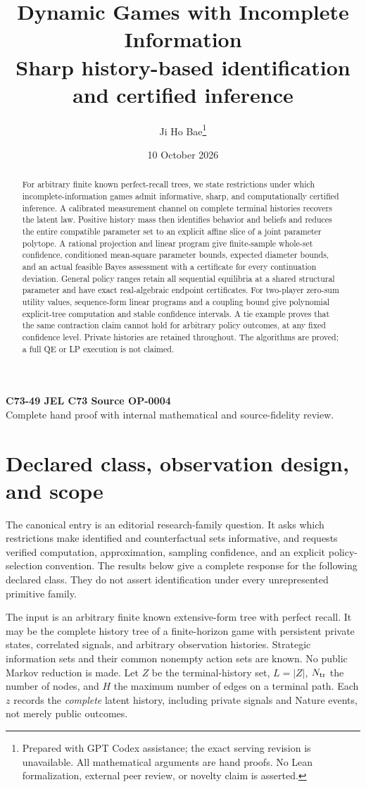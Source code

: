 \documentclass[11pt,a4paper]{article}
\title{Dynamic Games with Incomplete Information\\[4pt]
 \large Sharp history-based identification and certified inference}
\author{Ji Ho Bae\thanks{Prepared with GPT Codex assistance; the exact
serving revision is unavailable. All mathematical arguments are hand
proofs. No Lean formalization, external peer review, or novelty claim
is asserted.}}
\date{10 October 2026}
\numberwithin{equation}{section}
\theoremstyle{definition}
\begin{document}
\maketitle
\begin{center}
\small\textbf{C73-49 \quad JEL C73 \quad Source OP-0004}\\
Complete hand proof with internal mathematical and source-fidelity review.
\end{center}
\begin{abstract}
For arbitrary finite known perfect-recall trees, we state restrictions
under which incomplete-information games admit informative, sharp,
and computationally certified inference. A calibrated measurement
channel on complete terminal histories recovers the latent law.
Positive history mass then identifies behavior and beliefs and reduces
the entire compatible parameter set to an explicit affine slice of
a joint parameter polytope. A rational projection and linear program
give finite-sample whole-set confidence, conditioned mean-square
parameter bounds, expected diameter bounds, and an actual feasible
Bayes assessment with a certificate for every continuation deviation.
General policy ranges retain all sequential equilibria at a shared
structural parameter and have exact real-algebraic endpoint certificates.
For two-player zero-sum utility values, sequence-form linear programs
and a coupling bound give polynomial explicit-tree computation and
stable confidence intervals. A tie example proves that the same
contraction claim cannot hold for arbitrary policy outcomes, at any
fixed confidence level. Private histories are retained throughout.
The algorithms are proved; a full QE or LP execution is not claimed.
\end{abstract}

\section{Declared class, observation design, and scope}\label{sec:model}
The canonical entry is an editorial research-family question. It asks
which restrictions make identified and counterfactual sets informative,
and requests verified computation, approximation, sampling confidence,
and an explicit policy-selection convention. The results below give a
complete response for the following declared class. They do not assert
identification under every unrepresented primitive family.

The input is an arbitrary finite known extensive-form tree with perfect
recall. It may be the complete history tree of a finite-horizon game
with persistent private states, correlated signals, and arbitrary
observation histories. Strategic information sets and their common
nonempty action sets are known. No public Markov reduction is made.
Let \(Z\) be the terminal-history set, \(L=|Z|\), \(N_{\rm tr}\) the
number of nodes, and \(H\) the maximum number of edges on a terminal path.
Each \(z\) records the \emph{complete} latent history, including private
signals and Nature events, not merely public outcomes.
\end{document}
